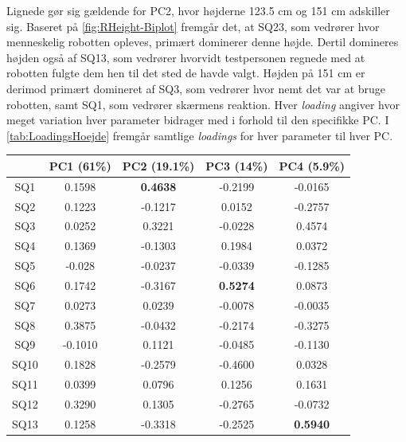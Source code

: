 Lignede gør sig gældende for PC2, hvor højderne 123.5 cm og 151 cm adskiller sig. Baseret på \autoref{fig:RHeight-Biplot} fremgår det, at SQ23, som vedrører hvor menneskelig robotten opleves, primært dominerer denne højde. Dertil domineres højden også af SQ13, som vedrører hvorvidt testpersonen regnede med at robotten fulgte dem hen til det sted de havde valgt. Højden på 151 cm er derimod primært domineret af SQ3, som vedrører hvor nemt det var at bruge robotten, samt SQ1, som vedrører skærmens reaktion. \blankline
%
Hver \textit{loading} angiver hvor meget variation hver parameter bidrager med i forhold til den specifikke PC. I \autoref{tab:LoadingsHoejde} fremgår samtlige \textit{loadings} for hver parameter til hver PC.  
%
\begin{table}[H]
\centering
\begin{tabular}{c|c|c|c|c}
    & PC1 (61\%)      & PC2 (19.1\%)    & PC3 (14\%)      & PC4 (5.9\%)     \\ \hline
SQ1  & 0.1598          & \textbf{0.4638} & -0.2199         & -0.0165         \\ \hline
SQ2  & 0.1223          & -0.1217         & 0.0152          & -0.2757         \\ \hline
SQ3  & 0.0252          & 0.3221          & -0.0228         & 0.4574          \\ \hline
SQ4  & 0.1369          & -0.1303         & 0.1984          & 0.0372          \\ \hline
SQ5  & -0.028          & -0.0237         & -0.0339         & -0.1285         \\ \hline
SQ6  & 0.1742          & -0.3167         & \textbf{0.5274} & 0.0873          \\ \hline
SQ7  & 0.0273          & 0.0239          & -0.0078         & -0.0035         \\ \hline
SQ8  & 0.3875          & -0.0432         & -0.2174         & -0.3275         \\ \hline
SQ9  & -0.1010         & 0.1121          & -0.0485         & -0.1130          \\ \hline
SQ10 & 0.1828          & -0.2579         & -0.4600         & 0.0328          \\ \hline
SQ11 & 0.0399          & 0.0796          & 0.1256          & 0.1631          \\ \hline
SQ12 & 0.3290          & 0.1305          & -0.2765         & -0.0732         \\ \hline
SQ13 & 0.1258          & -0.3318         & -0.2525         & \textbf{0.5940} \\ \hline

\end{tabular}
\end{table}
